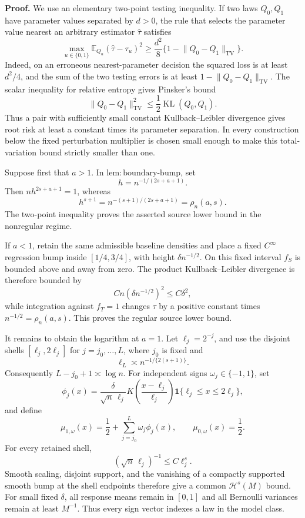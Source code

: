 \textbf{Proof.}
We use an elementary two-point testing inequality.  If two laws \(Q_0,Q_1\) have parameter values separated by \(d>0\), the rule that selects the parameter value nearest an arbitrary estimator \(\widehat\tau\) satisfies
\[
 \max_{u\in\{0,1\}}\mathbb E_{Q_u}(\widehat\tau-\tau_u)^2
 \ge \frac{d^2}{8}\{1-\lVert Q_0-Q_1\rVert_{\mathrm{TV}}\}.
\]
Indeed, on an erroneous nearest-parameter decision the squared loss is at least \(d^2/4\), and the sum of the two testing errors is at least \(1-\lVert Q_0-Q_1\rVert_{\mathrm{TV}}\).  The scalar inequality for relative entropy gives Pinsker's bound
\[
 \lVert Q_0-Q_1\rVert_{\mathrm{TV}}^2
 \le \frac12\operatorname{KL}(Q_0,Q_1).
\]
Thus a pair with sufficiently small constant Kullback--Leibler divergence gives root risk at least a constant times its parameter separation.  In every construction below the fixed perturbation multiplier is chosen small enough to make this total-variation bound strictly smaller than one.

Suppose first that \(a>1\).  In \(\mathrm{lem:boundary\text{-}bump}\), set
\[
 h=n^{-1/(2s+a+1)}.
\]
Then \(nh^{2s+a+1}=1\), whereas
\[
 h^{s+1}=n^{-(s+1)/(2s+a+1)}=\rho_n(a,s).
\]
The two-point inequality proves the asserted source lower bound in the nonregular regime.

If \(a<1\), retain the same admissible baseline densities and place a fixed \(C^\infty\) regression bump inside \([1/4,3/4]\), with height \(\delta n^{-1/2}\).  On this fixed interval \(f_S\) is bounded above and away from zero.  The product Kullback--Leibler divergence is therefore bounded by
\[
 Cn(\delta n^{-1/2})^2\le C\delta^2,
\]
while integration against \(f_T=1\) changes \(\tau\) by a positive constant times \(n^{-1/2}=\rho_n(a,s)\).  This proves the regular source lower bound.

It remains to obtain the logarithm at \(a=1\).  Let \(\ell_j=2^{-j}\), and use the disjoint shells \([\ell_j,2\ell_j]\) for \(j=j_0,\ldots,L\), where \(j_0\) is fixed and
\[
 \ell_L\asymp n^{-1/\{2(s+1)\}}.
\]
Consequently \(L-j_0+1\asymp\log n\).  For independent signs \(\omega_j\in\{-1,1\}\), set
\[
 \phi_j(x)=\frac{\delta}{\sqrt n\,\ell_j}
 K\!\left(\frac{x-\ell_j}{\ell_j}\right)
 \mathbf 1\{\ell_j\le x\le2\ell_j\},
\]
and define
\[
 \mu_{1,\omega}(x)=\frac12+\sum_{j=j_0}^L\omega_j\phi_j(x),
 \qquad
 \mu_{0,\omega}(x)=\frac12.
\]
For every retained shell,
\[
 (\sqrt n\,\ell_j)^{-1}\le C\ell_j^s.
\]
Smooth scaling, disjoint support, and the vanishing of a compactly supported smooth bump at the shell endpoints therefore give a common \(\mathcal H^s(M)\) bound.  For small fixed \(\delta\), all response means remain in \([0,1]\) and all Bernoulli variances remain at least \(M^{-1}\).  Thus every sign vector indexes a law in the model class.


